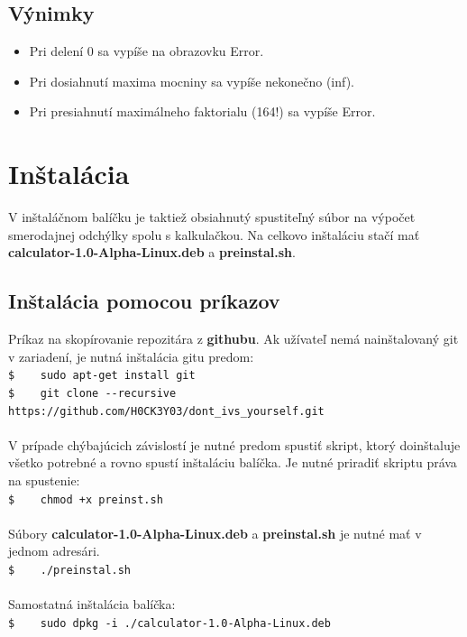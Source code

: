 \documentclass[11pt, a4paper]{article}
\begin{document}
\subsection{Výnimky}
\begin{itemize}
 \item Pri delení 0 sa vypíše na obrazovku Error.
 \item Pri dosiahnutí maxima mocniny sa vypíše nekonečno (inf).
 \item Pri presiahnutí maximálneho faktorialu (164!) sa vypíše Error. 
\end{itemize}

\newpage
\section{Inštalácia}
V inštaláčnom balíčku je taktiež obsiahnutý spustiteľný súbor na výpočet smerodajnej odchýlky spolu s kalkulačkou. Na celkovo inštaláciu stačí mať \textbf{calculator-1.0-Alpha-Linux.deb} a \textbf{preinstal.sh}.
\subsection{Inštalácia pomocou príkazov}
Príkaz na skopírovanie repozitára z \textbf{githubu}. Ak užívateľ nemá nainštalovaný git v zariadení, je nutná inštalácia gitu predom: \\  
\verb|$    sudo apt-get install git |  \\
\verb|$    git clone --recursive https://github.com/H0CK3Y03/dont_ivs_yourself.git |  \\ \\
V prípade chýbajúcich závislostí je nutné predom spustiť skript, ktorý doinštaluje všetko potrebné a rovno spustí inštaláciu balíčka. Je nutné priradiť skriptu práva na spustenie: \\ 
\verb|$    chmod +x preinst.sh| \\ \\
Súbory \textbf{calculator-1.0-Alpha-Linux.deb} a \textbf{preinstal.sh} je nutné mať v jednom adresári. \\
\verb|$    ./preinstal.sh| \\ \\
Samostatná inštalácia balíčka: \\
\verb|$    sudo dpkg -i ./calculator-1.0-Alpha-Linux.deb| \\
\newpage
\end{document}
